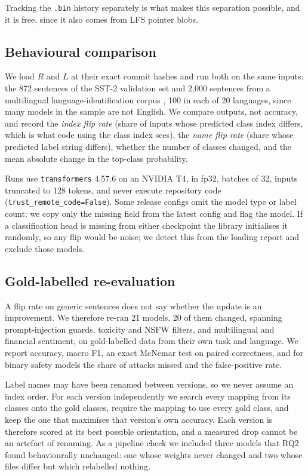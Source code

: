 \documentclass[conference]{IEEEtran}
\newcommand{\code}[1]{\texttt{#1}}
\begin{document}
Tracking the \code{.bin} history separately is what makes this separation possible, and it is free, since it also comes from LFS pointer blobs.

\subsection{Behavioural comparison}
We load $R$ and $L$ at their exact commit hashes and run both on the same inputs: the 872 sentences of the SST-2 validation set \cite{socher2013} and 2,000 sentences from a multilingual language-identification corpus \cite{papluca}, 100 in each of 20 languages, since many models in the sample are not English. We compare outputs, not accuracy, and record the \emph{index flip rate} (share of inputs whose predicted class index differs, which is what code using the class index sees), the \emph{name flip rate} (share whose predicted label string differs), whether the number of classes changed, and the mean absolute change in the top-class probability.

Runs use \code{transformers} 4.57.6 on an NVIDIA T4, in fp32, batches of 32, inputs truncated to 128 tokens, and never execute repository code (\code{trust\_remote\_code=False}). Some release configs omit the model type or label count; we copy only the missing field from the latest config and flag the model. If a classification head is missing from either checkpoint the library initialises it randomly, so any flip would be noise; we detect this from the loading report and exclude those models.

\subsection{Gold-labelled re-evaluation}\label{sec:gold}
A flip rate on generic sentences does not say whether the update is an improvement. We therefore re-ran 21 models, 20 of them changed, spanning prompt-injection guards, toxicity and NSFW filters, and multilingual and financial sentiment, on gold-labelled data from their own task and language. We report accuracy, macro F1, an exact McNemar test on paired correctness, and for binary safety models the share of attacks missed and the false-positive rate.

Label names may have been renamed between versions, so we never assume an index order. For each version independently we search every mapping from its classes onto the gold classes, require the mapping to use every gold class, and keep the one that maximises that version's own accuracy. Each version is therefore scored at its best possible orientation, and a measured drop cannot be an artefact of renaming. As a pipeline check we included three models that RQ2 found behaviourally unchanged: one whose weights never changed and two whose files differ but which relabelled nothing.
\end{document}
